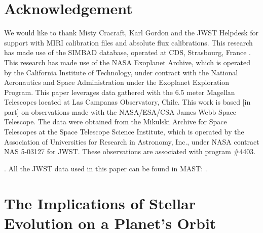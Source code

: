\documentclass[twocolumn]{aastex631}
\begin{document}
\section*{Acknowledgement}
We would like to thank Misty Cracraft, Karl Gordon and the JWST Helpdesk for support with MIRI calibration files and absolute flux calibrations. This research has made use of the SIMBAD database,
operated at CDS, Strasbourg, France \citep{2000A&AS..143....9W}.
This research has made use of the NASA Exoplanet Archive, which is operated by the California Institute of Technology, under contract with the National Aeronautics and Space Administration under the Exoplanet Exploration Program. This paper leverages data gathered with the 6.5 meter Magellan Telescopes located at Las Campanas Observatory, Chile.
This work is based [in part] on observations made with the NASA/ESA/CSA James Webb Space Telescope. The data were obtained from the Mikulski Archive for Space Telescopes at the Space Telescope Science Institute, which is operated by the Association of Universities for Research in Astronomy, Inc., under NASA contract NAS 5-03127 for JWST. These observations are associated with program \#4403.



. All the JWST data used in this paper can be found in MAST:  .






\appendix
\section{The Implications of Stellar Evolution on a Planet's Orbit}\label{AppA}
\end{document}
